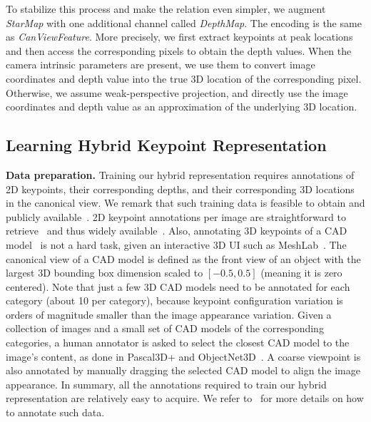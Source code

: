 \documentclass[runningheads]{llncs}
\begin{document}
To stabilize this process and make the relation even simpler, we augment \emph{StarMap} with one additional channel called \emph{DepthMap}. 
The encoding is the same as \emph{CanViewFeature}. 
More precisely, we first extract keypoints at peak locations and then access the corresponding pixels to obtain the depth values.
When the camera intrinsic parameters are present, we use them to convert image coordinates and depth value into the true 3D location of the corresponding pixel. 
Otherwise, we assume weak-perspective projection, and directly use the image coordinates and depth value as an approximation of the underlying 3D location.

\label{Section:Representation:Encoding}

\subsection{Learning Hybrid Keypoint Representation}
\label{Section:Training:Data:Preparation}

\noindent\textbf{Data preparation.} 
Training our hybrid representation requires annotations of 2D keypoints, their corresponding depths, and their corresponding 3D locations in the canonical view.
We remark that such training data is feasible to obtain and publicly available~\cite{xiang2014beyond,xiang2016objectnet3d}. 
2D keypoint annotations per image are straightforward to retrieve~\cite{papadopoulos2017extreme} and thus widely available~\cite{lin2014microsoft,andriluka14cvpr,bourdev2010detecting}.
Also, annotating 3D keypoints of a CAD model~\cite{yi2016scalable} is not a hard task, given an interactive 3D UI such as MeshLab~\cite{LocalChapterEvents:ItalChap:ItalianChapConf2008:129-136}. 
The canonical view of a CAD model is defined as the front view of an object with the largest 3D bounding box dimension scaled to $[-0.5, 0.5]$ (meaning it is zero centered). 
Note that just a few 3D CAD models need to be annotated for each category (about 10 per category), because keypoint configuration variation is orders of magnitude smaller than the image appearance variation. 
Given a collection of images and a small set of CAD models of the corresponding categories, a human annotator is asked to select the closest CAD model to the image's content, as done in Pascal3D+ and ObjectNet3D~\cite{xiang2014beyond,xiang2016objectnet3d}.
A coarse viewpoint is also annotated by manually dragging the selected CAD model to align the image appearance. 
In summary, all the annotations required to train our hybrid representation are relatively easy to acquire. 
We refer to~\cite{xiang2014beyond,xiang2016objectnet3d} for more details on how to annotate such data. 
\end{document}
